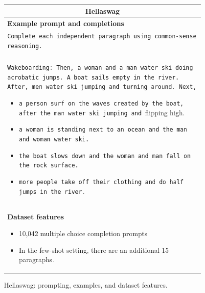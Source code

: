 \documentclass{article}
\begin{document}
\begin{figure}[p]
    \centering \small
    \begin{tabular}{p{0.95\linewidth}}
    \toprule
    \multicolumn{1}{c}{\textbf{Hellaswag}} \\

    \midrule
    \textbf{Example prompt and completions}  \\
    \texttt{Complete each independent paragraph using common-sense reasoning.} \\\\
    \texttt{Wakeboarding: Then, a woman and a man water ski doing acrobatic jumps. A boat sails empty in the river. After, men water ski jumping and turning around. Next,}
    \begin{itemize}
        \item \texttt{a person surf on the waves created by the boat, after the man water ski jumping and }flipping high.
        \item \texttt{a woman is standing next to an ocean and the man and woman water ski.}
        \item \texttt{the boat slows down and the woman and man fall on the rock surface.}
        \item \texttt{more people take off their clothing and do half jumps in the river.}
    \end{itemize} \\

    \midrule
    \textbf{Dataset features}
    \begin{itemize}
        \item 10,042 multiple choice completion prompts
        \item In the few-shot setting, there are an additional 15 paragraphs.
    \end{itemize} \\

    \bottomrule
    \end{tabular}
    \caption{Hellaswag: prompting, examples, and dataset features.}
    \label{tab:prompt-hellaswag}
\end{figure}
\end{document}
